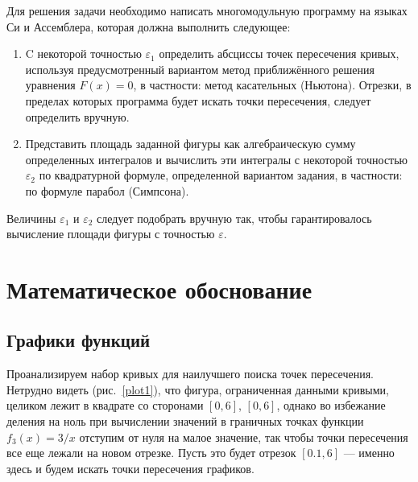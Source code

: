 \documentclass[a4paper,12pt,titlepage,finall]{article}
\begin{document}
Для решения задачи необходимо написать многомодульную программу на языках Си и Ассемблера, которая должна выполнить следующее:
\begin{enumerate}
	\item C некоторой точностью $\varepsilon_1$ определить абсциссы точек пересечения кривых, используя предусмотренный вариантом метод приближённого решения уравнения $F(x)=0$, в частности: метод касательных (Ньютона). Отрезки, в пределах которых программа будет искать точки пересечения, следует определить вручную.
	\item Представить площадь заданной фигуры как алгебраическую сумму определенных интегралов и вычислить эти интегралы с некоторой точностью $\varepsilon_2$ по квадратурной формуле, определенной вариантом задания, в частности: по формуле парабол (Симпсона).
\end{enumerate}

Величины $\varepsilon_1$ и $\varepsilon_2$ следует подобрать вручную так, чтобы гарантировалось вычисление площади фигуры с точностью $\varepsilon$. 

\newpage

\section{Математическое обоснование}

\subsection{Графики функций}

Проанализируем набор кривых для наилучшего поиска точек пересечения. Нетрудно видеть (рис.~\ref{plot1}), что фигура, ограниченная данными кривыми, целиком лежит в квадрате со сторонами $[0,6]$, $[0,6]$, однако во избежание деления на ноль при вычислении значений в граничных точках функции $f_3(x)=3/x$ отступим от нуля на малое значение, так чтобы точки пересечения все еще лежали на новом отрезке. Пусть это будет отрезок $[0.1,6]$ — именно здесь и будем искать точки пересечения графиков. 
\end{document}
